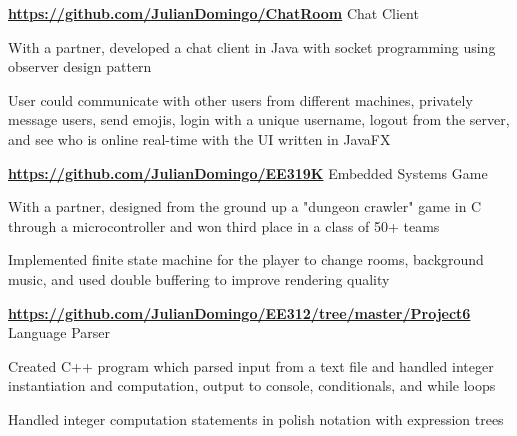 \begin{cventries}
  \cventry
    {\normalsize \textbf{\url{https://github.com/JulianDomingo/ChatRoom}}}
    {\large Chat Client}
    {}
    {}
    {
      \begin{cvitems}
        \item {\normalsize With a partner, developed a chat client in Java with socket programming using observer design pattern}
        \item {\normalsize User could communicate with other users from different machines, privately message users, send emojis, login with a unique username, logout from the server, and see who is online real-time with the UI written in JavaFX}
      \end{cvitems}
    }
  \cventry
    {\normalsize \textbf{\url{https://github.com/JulianDomingo/EE319K}}}
    {\large Embedded Systems Game}
    {}
    {}
    {
      \begin{cvitems}
        \item {\normalsize With a partner, designed from the ground up a "dungeon crawler" game in C through a microcontroller and won third place in a class of 50+ teams}
        \item {\normalsize Implemented finite state machine for the player to change rooms, background music, and used double buffering to improve rendering quality}
      \end{cvitems}
    }
  \cventry
    {\normalsize \textbf{\url{https://github.com/JulianDomingo/EE312/tree/master/Project6}}}
    {\large Language Parser}
    {}
    {}
    {
      \begin{cvitems}
        \item {\normalsize Created C++ program which parsed input from a text file and handled integer instantiation and computation, output to console, conditionals, and while loops}
        \item {\normalsize Handled integer computation statements in polish notation with expression trees}
      \end{cvitems}
    }
\end{cventries}
